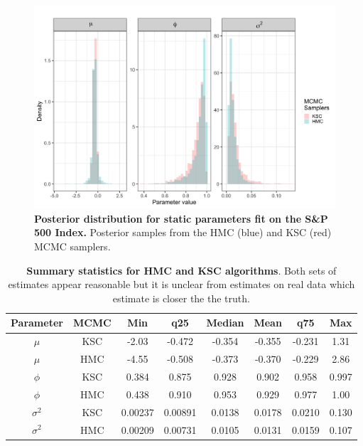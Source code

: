 \documentclass[12pt, a4paper]{article}
\begin{document}

    \begin{figure}[H]
        \centering
        \includegraphics[scale=0.105]{motivating_example/real_data_ex.png}
        \caption{\textbf{Posterior distribution for static parameters fit on the S\&P 500 Index.} Posterior samples from the HMC (blue) and KSC (red) MCMC samplers.}
        \label{fig:realdataex}
    \end{figure}

    \begin{table}[H]
        \centering
        \begin{tabular}{|c|c|c|c|c|c|c|c|} \hline 
        Parameter&  MCMC&Min& q25&  Median& Mean & q75&Max\\ \hline 
        $\mu$&  KSC&-2.03 & -0.472 & -0.354 & -0.355 & -0.231 & 1.31 \\
     $\mu$&  HMC&-4.55 & -0.508 & -0.373 & -0.370 & -0.229 &2.86  \\\hline 
     $\phi$&  KSC&0.384 & 0.875 & 0.928 & 0.902 & 0.958 & 0.997 \\
     $\phi$&  HMC&0.438 & 0.910 & 0.953 & 0.929 & 0.977 &1.00  \\ \hline 
     $\sigma^2$&  KSC&0.00237 & 0.00891 & 0.0138 & 0.0178 & 0.0210 & 0.130 \\ 
     $\sigma^2$&  HMC&0.00209 & 0.00731 & 0.0105 & 0.0131 & 0.0159 &0.107 \\ \hline
        \end{tabular}
        \caption{\textbf{Summary statistics for HMC and KSC algorithms}. Both sets of estimates appear reasonable but it is unclear from estimates on real data which estimate is closer the the truth.}
        \label{tab:realdata}
    \end{table}
    
\end{document}
